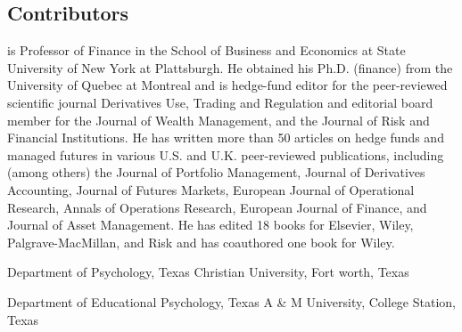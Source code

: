 \begin{frontmatter}
\chapter*{Contributors}
\end{frontmatter}

\begin{contributorslist}
   is Professor of Finance in the School of
  Business and Economics at State University of New York at
  Plattsburgh. He obtained his Ph.D. (finance) from the University of
  Quebec at Montreal and is hedge-fund editor for the peer-reviewed
  scientific journal Derivatives Use, Trading and Regulation and
  editorial board member for the Journal of Wealth Management, and the
  Journal of Risk and Financial Institutions. He has written more than
  50 articles on hedge funds and managed futures in various U.S. and
  U.K. peer-reviewed publications, including (among others) the
  Journal of Portfolio Management, Journal of Derivatives Accounting,
  Journal of Futures Markets, European Journal of Operational
  Research, Annals of Operations Research, European Journal of
  Finance, and Journal of Asset Management. He has edited 18 books for
  Elsevier, Wiley, Palgrave-MacMillan, and Risk and has coauthored one
  book for Wiley.

   Department of Psychology, Texas Christian
  University, Fort worth, Texas

   Department of Educational Psychology, Texas A \&
  M University, College Station, Texas
\end{contributorslist}

